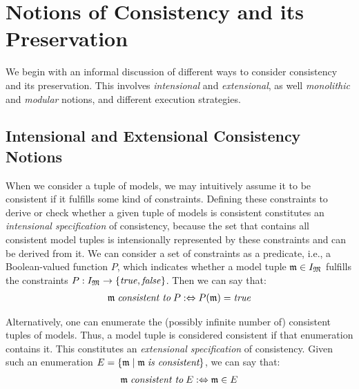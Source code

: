 \section{Notions of Consistency and its Preservation}
\label{chap:correctness:notions_consistency}

We begin with an informal discussion of different ways to consider consistency and its preservation. This involves \emph{intensional} and \emph{extensional}, as well \emph{monolithic} and \emph{modular} notions, and different execution strategies.

\subsection{Intensional and Extensional Consistency Notions}
\label{chap:correctness:notions_consistency:intensional_extensional}

When we consider a tuple of models, we may intuitively assume it to be consistent if it fulfills some kind of constraints.
Defining these constraints to derive or check whether a given tuple of models is consistent constitutes an \emph{intensional specification} of consistency, because the set that contains all consistent model tuples is intensionally represented by these constraints and can be derived from it.
We can consider a set of constraints as a predicate, i.e., a Boolean-valued function $P$, which indicates whether a model tuple $\modeltuple{m} \in \metamodeltupleinstanceset{M}$ fulfills the constraints $P: \metamodeltupleinstanceset{M} \rightarrow \setted{\truemath, \falsemath}$. Then we can say that:
\begin{align*}
    \modeltuple{m} \consistenttomath P \equivalentperdefinition P(\modeltuple{m}) = \truemath
\end{align*}

Alternatively, one can enumerate the (possibly infinite number of) consistent tuples of models.
Thus, a model tuple is considered consistent if that enumeration contains it.
This constitutes an \emph{extensional specification} of consistency.
Given such an enumeration $E = \setted{\modeltuple{m} \mid \modeltuple{m} \mathtextspacebefore{is consistent}}$, we can say that:
\begin{align*}
    \modeltuple{m} \consistenttomath E \equivalentperdefinition \modeltuple{m} \in E
\end{align*}

